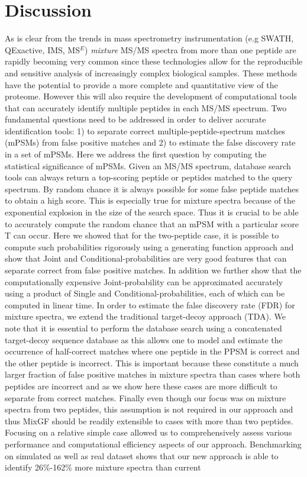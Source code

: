 \documentclass[runningheads,a4paper]{llncs}
\begin{document}
\vspace{-2mm}
\section*{Discussion}
As is clear from the trends in mass spectrometry instrumentation (e.g SWATH, QExactive, IMS, MS$^{E}$\cite{masselon2003itp,venable2004aaq,plumb2006uplc,chakraborty2007uim,panchaud2009precursor,michalski2011mass,2012targeted}) \emph{mixture} MS/MS spectra from more than one peptide are rapidly becoming very common since these technologies allow for the reproducible and sensitive analysis of increasingly complex biological samples.  These methods have the potential to provide a more complete and quantitative view of the proteome. However this will also require the development of computational tools that can accurately identify multiple peptides in each MS/MS spectrum.  Two fundamental questions need to be addressed in order to deliver accurate identification tools: 1) to separate correct multiple-peptide-spectrum matches (mPSMs) from false positive matches and 2) to estimate the false discovery rate in a set of mPSMs.  Here we address the first question by computing the statistical significance of mPSMs. Given an MS/MS spectrum, database search tools can always return a top-scoring peptide or peptides matched to the query spectrum. By random chance it is always possible for some false peptide matches to obtain a high score.  This is especially true for mixture spectra because of the exponential explosion in the size of the search space.  Thus it is crucial to be able to accurately compute the random chance that an mPSM with a particular score T can occur.  Here we showed that for the two-peptide case, it is possible to compute such probabilities rigorously using a generating function approach and show that Joint and Conditional-probabilities are very good features that can separate correct from false positive matches.  In addition we further show that the computationally expensive Joint-probability can be approximated accurately using a product of Single and Conditional-probabilities, each of which can be computed in linear time.  In order to estimate the false discovery rate (FDR) for mixture spectra, we extend the traditional target-decoy approach (TDA).  We note that it is essential to perform the database search using a concatenated target-decoy sequence database as this allows one to model and estimate the occurrence of half-correct matches where one peptide in the PPSM is correct and the other peptide is incorrect.  This is important because these constitute a much larger fraction of false positive matches in mixture spectra than cases where both peptides are incorrect and as we show here these cases are more difficult to separate from correct matches.  Finally even though our focus was on mixture spectra from two peptides, this assumption is not required in our approach and thus MixGF should be readily extensible to cases with more than two peptides.  Focusing on a relative simple case allowed us to comprehensively assess various performance and computational efficiency aspects of our approach.  Benchmarking on simulated as well as real dataset shows that our new approach is able to identify 26\%-162\% more mixture spectra than current 
\end{document}

